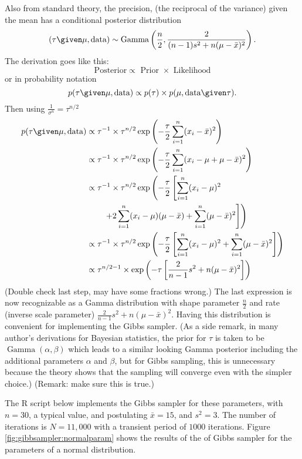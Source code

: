 \documentclass[12pt]{article}
\begin{document}
Also from standard theory, the precision, (the reciprocal of the
variance) given the mean has a conditional posterior distribution
\[
    (\tau \given \mu, \text{data}) \sim
    \operatorname{Gamma}
    \left( \frac{n}{2}, \frac{2}{(n-1) s^2 + n (\mu - \bar{x})^2} \right).
\] The derivation goes like this:
\[
    \text{ Posterior} \propto \text{ Prior } \times \text{ Likelihood }
\] or in probability notation
\[
    p(\tau \given \mu, \text{data} ) \propto p(\tau) \times p( \mu,
    \text{data} \given \tau).
\] Then using \( \frac{1}{\sigma^n} = \tau^{n/2} \)
\begin{align*}
    p(\tau \given \mu, \text{data} ) &\propto \tau^{-1} \times \tau^{n/2}
    \exp \left( -\frac{\tau}{2} \sum\limits_{i=1}^n (x_i - \bar{x})^2
    \right) \\
    & \propto \tau^{-1} \times \tau^{n/2} \exp \left( -\frac{\tau}{2}
    \sum\limits_{i=1}^n (x_i - \mu + \mu - \bar{x})^2 \right) \\
    & \propto \tau^{-1} \times \tau^{n/2} \exp \left( -\frac{\tau}{2}
      \left[ \sum\limits_{i=1}^n (x_i - \mu)^2 \right. \right. \\
    & \qquad \left. \left. +2 \sum\limits_{i=1}^n (x_i
    - \mu)(\mu - \bar{x}) + \sum\limits_{i=1}^n (\mu - \bar{x})^2 \right]
    \right) \\
    & \propto \tau^{-1} \times \tau^{n/2} \exp \left( -\frac{\tau}{2}
    \left[ \sum\limits_{i=1}^n (x_i - \mu)^2 + \sum\limits_{i=1}^n (\mu
    - \bar{x})^2 \right] \right) \\
    & \propto \tau^{n/2-1} \times \exp \left( -\tau \left[ \frac{2}{n-1}
    s^2 + n(\mu - \bar{x})^2 \right] \right) \\
\end{align*}
(Double check last step, may have some fractions wrong.) The last
expression is now recognizable as a Gamma distribution with shape
parameter \( \frac{n}{2} \) and rate (inverse scale parameter) \( \frac{2}
{n-1} s^2 + n(\mu - \bar{x})^2 \). Having this distribution is
convenient for implementing the Gibbs sampler.  (As a side remark, in
many author's derivations for Bayesian statistics, the prior for \( \tau
\) is taken to be \(
\operatorname{Gamma}
(\alpha, \beta) \) which leads to a similar looking Gamma posterior
including the additional parameters \( \alpha \) and \( \beta \), but
for Gibbs sampling, this is unnecessary because the theory shows that
the sampling will converge even with the simpler choice.) (Remark:  make
sure this is true.)

The R script below implements the Gibbs sampler for these parameters,
with \( n = 30 \), a typical value, and postulating \( \bar{x} = 15 \),
and \( s^2 = 3 \).  The number of iterations is \( N = 11{,}000 \) with
a transient period of \( 1000 \) iterations. Figure~%
\ref{fig:gibbsampler:normalparam} shows the results of the of Gibbs
sampler for the parameters of a normal distribution.
\end{document}
